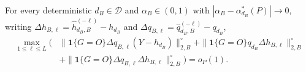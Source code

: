 For every deterministic \(d_B\in\mathcal D\) and \(\alpha_B\in(0,1)\) with \(|\alpha_B-\alpha_{d_B}^*(P)|\to0\), writing \(\Delta h_{B,\ell}=\widehat h_{d_B,B}^{(-\ell)}-h_{d_B}\) and \(\Delta q_{B,\ell}=\widehat q_{d_B,B}^{(-\ell)}-q_{d_B}\),
\[
\begin{aligned}
\max_{1\le\ell\le L}\bigl(&
\|\mathbf1\{G=O\}\Delta q_{B,\ell}(Y-h_{d_B})\|_{2,B}^{\circ}
+\|\mathbf1\{G=O\}q_{d_B}\Delta h_{B,\ell}\|_{2,B}^{\circ}\\
&+\|\mathbf1\{G=O\}\Delta q_{B,\ell}\Delta h_{B,\ell}\|_{2,B}^{\circ}
\bigr)=o_P(1).
\end{aligned}
\]